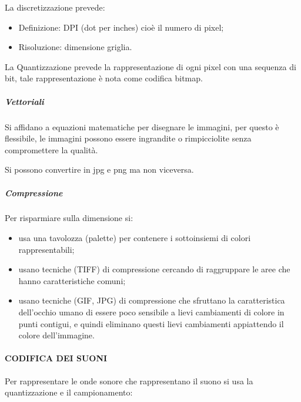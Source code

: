 \documentclass[
]{article}
\providecommand{\tightlist}{%
  \setlength{\itemsep}{0pt}\setlength{\parskip}{0pt}}
\begin{document}
{La discretizzazione prevede:}

\begin{itemize}
\tightlist
\item
  {Definizione}{: DPI (dot per inches) cioè il numero di pixel;}
\item
  {Risoluzione}{: dimensione griglia.}
\end{itemize}

{}

{La Quantizzazione prevede la rappresentazione di ogni pixel con una
sequenza di bit, tale rappresentazione è nota come codifica bitmap.}

{}

\subparagraph{\texorpdfstring{{Vettoriali}}{Vettoriali}}\label{h.k06v7yackkng}

{Si affidano a equazioni matematiche per disegnare le immagini, per
questo è flessibile, le immagini possono essere ingrandite o
rimpicciolite senza compromettere la qualità.}

{Si possono convertire in jpg e png ma non viceversa.}

{}

\subparagraph{\texorpdfstring{{Compressione}}{Compressione}}\label{h.qulnftgky44t}

{Per risparmiare sulla dimensione si:}

\begin{itemize}
\tightlist
\item
  {usa una tavolozza (palette) per contenere i sottoinsiemi di colori
  rappresentabili;}
\item
  {usano tecniche (}{TIFF}{) di compressione cercando di raggruppare le
  aree che hanno caratteristiche comuni;}
\item
  {usano tecniche (}{GIF, JPG}{) di compressione che sfruttano la
  caratteristica dell'occhio umano di essere poco sensibile a lievi
  cambiamenti di colore in punti contigui, e quindi eliminano questi
  lievi cambiamenti appiattendo il colore dell'immagine.}
\end{itemize}

{}

{}

\paragraph{\texorpdfstring{{CODIFICA DEI
SUONI}}{CODIFICA DEI SUONI}}\label{h.gf0fe4asjno9}

{Per rappresentare le onde sonore che rappresentano il suono si usa la
quantizzazione e il campionamento:}
\end{document}
